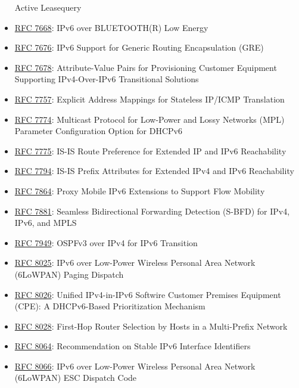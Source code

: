 \documentclass[
]{article}
\begin{document}
\begin{itemize}
  Active Leasequery
\item
  \href{https://www.rfc-editor.org/info/rfc7668}{RFC 7668}: IPv6 over
  BLUETOOTH(R) Low Energy
\item
  \href{https://www.rfc-editor.org/info/rfc7676}{RFC 7676}: IPv6 Support
  for Generic Routing Encapsulation (GRE)
\item
  \href{https://www.rfc-editor.org/info/rfc7678}{RFC 7678}:
  Attribute-Value Pairs for Provisioning Customer Equipment Supporting
  IPv4-Over-IPv6 Transitional Solutions
\item
  \href{https://www.rfc-editor.org/info/rfc7757}{RFC 7757}: Explicit
  Address Mappings for Stateless IP/ICMP Translation
\item
  \href{https://www.rfc-editor.org/info/rfc7774}{RFC 7774}: Multicast
  Protocol for Low-Power and Lossy Networks (MPL) Parameter
  Configuration Option for DHCPv6
\item
  \href{https://www.rfc-editor.org/info/rfc7775}{RFC 7775}: IS-IS Route
  Preference for Extended IP and IPv6 Reachability
\item
  \href{https://www.rfc-editor.org/info/rfc7794}{RFC 7794}: IS-IS Prefix
  Attributes for Extended IPv4 and IPv6 Reachability
\item
  \href{https://www.rfc-editor.org/info/rfc7864}{RFC 7864}: Proxy Mobile
  IPv6 Extensions to Support Flow Mobility
\item
  \href{https://www.rfc-editor.org/info/rfc7881}{RFC 7881}: Seamless
  Bidirectional Forwarding Detection (S-BFD) for IPv4, IPv6, and MPLS
\item
  \href{https://www.rfc-editor.org/info/rfc7949}{RFC 7949}: OSPFv3 over
  IPv4 for IPv6 Transition
\item
  \href{https://www.rfc-editor.org/info/rfc8025}{RFC 8025}: IPv6 over
  Low-Power Wireless Personal Area Network (6LoWPAN) Paging Dispatch
\item
  \href{https://www.rfc-editor.org/info/rfc8026}{RFC 8026}: Unified
  IPv4-in-IPv6 Softwire Customer Premises Equipment (CPE): A
  DHCPv6-Based Prioritization Mechanism
\item
  \href{https://www.rfc-editor.org/info/rfc8028}{RFC 8028}: First-Hop
  Router Selection by Hosts in a Multi-Prefix Network
\item
  \href{https://www.rfc-editor.org/info/rfc8064}{RFC 8064}:
  Recommendation on Stable IPv6 Interface Identifiers
\item
  \href{https://www.rfc-editor.org/info/rfc8066}{RFC 8066}: IPv6 over
  Low-Power Wireless Personal Area Network (6LoWPAN) ESC Dispatch Code

\end{itemize}
\end{document}
